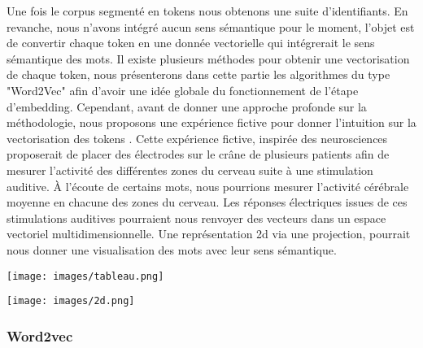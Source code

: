 \documentclass[12pt]{article}
\theoremstyle{definition}
\begin{document}
	Une fois le corpus segmenté en tokens nous obtenons une suite d'identifiants. En revanche, nous n'avons intégré aucun sens sémantique pour le moment, l'objet est de convertir chaque token en une donnée vectorielle qui intégrerait le sens sémantique des mots. Il existe plusieurs méthodes pour obtenir une vectorisation de chaque token, nous présenterons dans cette partie les algorithmes du type "Word2Vec" afin d'avoir une idée globale du fonctionnement de l'étape d'embedding. Cependant, avant de donner une approche profonde sur la méthodologie, nous proposons une expérience fictive pour donner l'intuition sur la vectorisation des tokens \cite{video_embedding}. Cette expérience fictive, inspirée des neurosciences proposerait de placer des électrodes sur le crâne de plusieurs patients afin de mesurer l’activité des différentes zones du cerveau suite à une stimulation auditive. À l’écoute de certains mots, nous pourrions mesurer l’activité cérébrale moyenne en chacune des zones du cerveau. Les réponses électriques issues de ces stimulations auditives pourraient nous renvoyer des vecteurs dans un espace vectoriel multidimensionnelle. Une représentation 2d via une projection, pourrait nous donner une visualisation des mots avec leur sens sémantique. \\[1cm] 
	

	\begin{minipage}{1\textwidth}
		\begin{minipage}{0.45\textwidth}
			\texttt{[image: images/tableau.png]}
		\end{minipage}\hfil\begin{minipage}{0.4\textwidth}
			\texttt{[image: images/2d.png]}
	\end{minipage}
	
	\end{minipage}

	\subsubsection{Word2vec}
	
\end{document}
